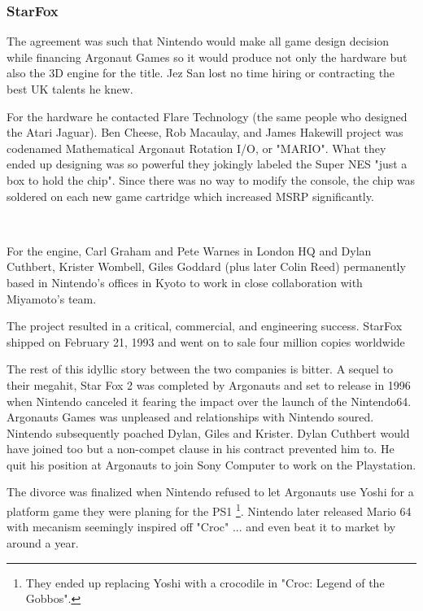 \subsubsection{StarFox}
The agreement was such that Nintendo would make all game design decision while financing Argonaut Games so it would produce not only the hardware but also the 3D engine for the title. Jez San lost no time hiring or contracting the best UK talents he knew.\\
\par
For the hardware he contacted Flare Technology (the same people who designed the Atari Jaguar). Ben Cheese, Rob Macaulay, and James Hakewill project was codenamed Mathematical Argonaut Rotation I/O, or "MARIO". What they ended up designing was so powerful they jokingly labeled the Super NES "just a box to hold the chip". Since there was no way to modify the console, the chip was soldered on each new game cartridge which increased MSRP significantly.\\
\par
{}\\
\par
For the engine, Carl Graham and Pete Warnes in London HQ and Dylan Cuthbert, Krister Wombell, Giles Goddard (plus later Colin Reed) permanently based in Nintendo's offices in Kyoto to work in close collaboration with Miyamoto's team.\\ 
\par
The project resulted in a critical, commercial, and engineering success. StarFox shipped on February 21, 1993 and went on to sale four million copies worldwide\\
 \par

The rest of this idyllic story between the two companies is bitter. A sequel to their megahit, Star Fox 2 was completed by Argonauts and set to release in 1996 when Nintendo canceled it fearing the impact over the launch of the Nintendo64. Argonauts Games was unpleased and relationships with Nintendo soured. Nintendo subsequently poached Dylan, Giles and Krister. Dylan Cuthbert would have joined too but a non-compet clause in his contract prevented him to. He quit his position at Argonauts to join Sony Computer to work on the Playstation.\\
\par
The divorce was finalized when Nintendo refused to let Argonauts use Yoshi for a platform game they were planing for the PS1 \footnote{They ended up replacing Yoshi with a crocodile in "Croc: Legend of the Gobbos".}. Nintendo later released Mario 64 with mecanism seemingly inspired off "Croc" ... and even beat it to market by around a year.





